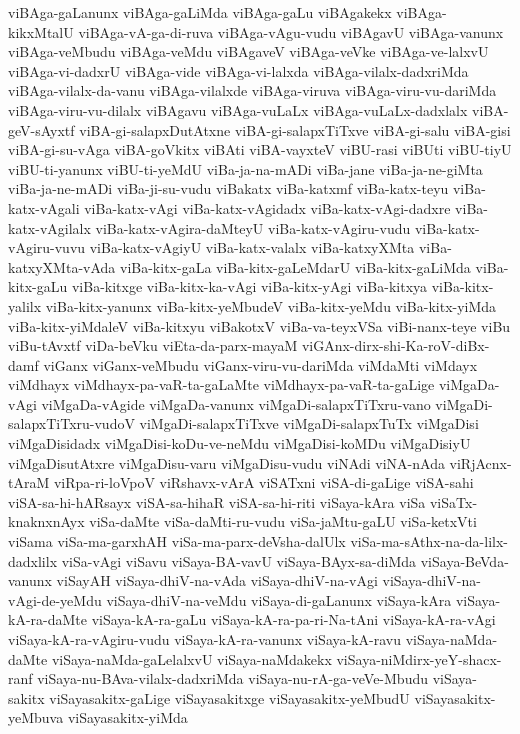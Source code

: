 {viBAga-gaLanunx
viBAga-gaLiMda
viBAga-gaLu
viBAgakekx
viBAga-kikxMtalU
viBAga-vA-ga-di-ruva
viBAga-vAgu-vudu
viBAgavU
viBAga-vanunx
viBAga-veMbudu
viBAga-veMdu
viBAgaveV
viBAga-veVke
viBAga-ve-lalxvU
viBAga-vi-dadxrU
viBAga-vide
viBAga-vi-lalxda
viBAga-vilalx-dadxriMda
viBAga-vilalx-da-vanu
viBAga-vilalxde
viBAga-viruva
viBAga-viru-vu-dariMda
viBAga-viru-vu-dilalx
viBAgavu
viBAga-vuLaLx
viBAga-vuLaLx-dadxlalx
viBA-geV-sAyxtf
viBA-gi-salapxDutAtxne
viBA-gi-salapxTiTxve
viBA-gi-salu
viBA-gisi
viBA-gi-su-vAga
viBA-goVkitx
viBAti
viBA-vayxteV
viBU-rasi
viBUti
viBU-tiyU
viBU-ti-yanunx
viBU-ti-yeMdU
viBa-ja-na-mADi
viBa-jane
viBa-ja-ne-giMta
viBa-ja-ne-mADi
viBa-ji-su-vudu
viBakatx
viBa-katxmf
viBa-katx-teyu
viBa-katx-vAgali
viBa-katx-vAgi
viBa-katx-vAgidadx
viBa-katx-vAgi-dadxre
viBa-katx-vAgilalx
viBa-katx-vAgira-daMteyU
viBa-katx-vAgiru-vudu
viBa-katx-vAgiru-vuvu
viBa-katx-vAgiyU
viBa-katx-valalx
viBa-katxyXMta
viBa-katxyXMta-vAda
viBa-kitx-gaLa
viBa-kitx-gaLeMdarU
viBa-kitx-gaLiMda
viBa-kitx-gaLu
viBa-kitxge
viBa-kitx-ka-vAgi
viBa-kitx-yAgi
viBa-kitxya
viBa-kitx-yalilx
viBa-kitx-yanunx
viBa-kitx-yeMbudeV
viBa-kitx-yeMdu
viBa-kitx-yiMda
viBa-kitx-yiMdaleV
viBa-kitxyu
viBakotxV
viBa-va-teyxVSa
viBi-nanx-teye
viBu
viBu-tAvxtf
viDa-beVku
viEta-da-parx-mayaM
viGAnx-dirx-shi-Ka-roV-diBx-damf
viGanx
viGanx-veMbudu
viGanx-viru-vu-dariMda
viMdaMti
viMdayx
viMdhayx
viMdhayx-pa-vaR-ta-gaLaMte
viMdhayx-pa-vaR-ta-gaLige
viMgaDa-vAgi
viMgaDa-vAgide
viMgaDa-vanunx
viMgaDi-salapxTiTxru-vano
viMgaDi-salapxTiTxru-vudoV
viMgaDi-salapxTiTxve
viMgaDi-salapxTuTx
viMgaDisi
viMgaDisidadx
viMgaDisi-koDu-ve-neMdu
viMgaDisi-koMDu
viMgaDisiyU
viMgaDisutAtxre
viMgaDisu-varu
viMgaDisu-vudu
viNAdi
viNA-nAda
viRjAcnx-tAraM
viRpa-ri-loVpoV
viRshavx-vArA
viSATxni
viSA-di-gaLige
viSA-sahi
viSA-sa-hi-hARsayx
viSA-sa-hihaR
viSA-sa-hi-riti
viSaya-kAra
viSa
viSaTx-knaknxnAyx
viSa-daMte
viSa-daMti-ru-vudu
viSa-jaMtu-gaLU
viSa-ketxVti
viSama
viSa-ma-garxhAH
viSa-ma-parx-deVsha-dalUlx
viSa-ma-sAthx-na-da-lilx-dadxlilx
viSa-vAgi
viSavu
viSaya-BA-vavU
viSaya-BAyx-sa-diMda
viSaya-BeVda-vanunx
viSayAH
viSaya-dhiV-na-vAda
viSaya-dhiV-na-vAgi
viSaya-dhiV-na-vAgi-de-yeMdu
viSaya-dhiV-na-veMdu
viSaya-di-gaLanunx
viSaya-kAra
viSaya-kA-ra-daMte
viSaya-kA-ra-gaLu
viSaya-kA-ra-pa-ri-Na-tAni
viSaya-kA-ra-vAgi
viSaya-kA-ra-vAgiru-vudu
viSaya-kA-ra-vanunx
viSaya-kA-ravu
viSaya-naMda-daMte
viSaya-naMda-gaLelalxvU
viSaya-naMdakekx
viSaya-niMdirx-yeY-shacx-ranf
viSaya-nu-BAva-vilalx-dadxriMda
viSaya-nu-rA-ga-veVe-Mbudu
viSaya-sakitx
viSayasakitx-gaLige
viSayasakitxge
viSayasakitx-yeMbudU
viSayasakitx-yeMbuva
viSayasakitx-yiMda
}
